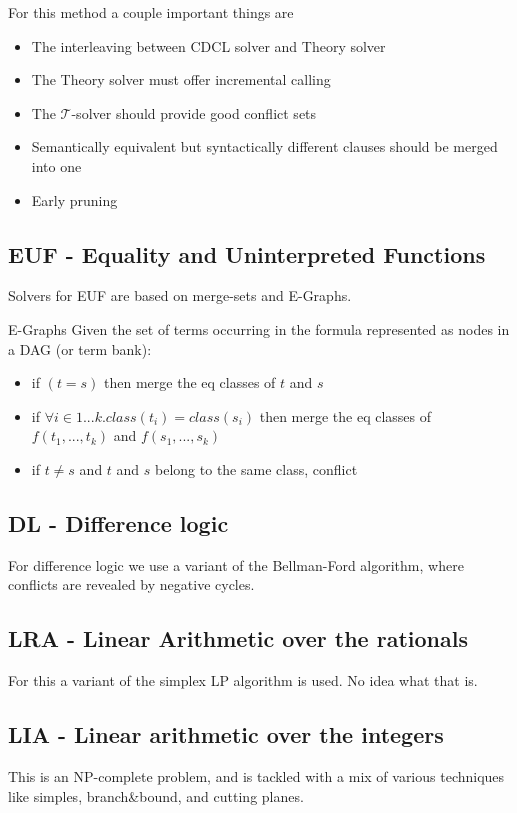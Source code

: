 \documentclass{article}
\begin{document}
For this method a couple important things are
\begin{itemize}
    \item The interleaving between CDCL solver and Theory solver
    \item The Theory solver must offer incremental calling
    \item The $\mathcal T$-solver should provide good conflict sets
    \item Semantically equivalent but syntactically different clauses should be merged into one
    \item Early pruning
\end{itemize}

\subsection*{EUF - Equality and Uninterpreted Functions}
Solvers for EUF are based on merge-sets and E-Graphs.
\begin{callout}{E-Graphs}
    Given the set of terms occurring in the formula represented as nodes in a DAG (or term bank):
    \begin{itemize}
        \item if $(t=s)$ then merge the eq classes of $t$ and $s$
        \item if $\forall i\in 1...k. class(t_i)=class(s_i)$ then merge the eq classes of $f(t_1,...,t_k)$ and $f(s_1,...,s_k)$
        \item if $t\neq s$ and $t$ and $s$ belong to the same class, conflict
    \end{itemize}
\end{callout}

\subsection*{DL - Difference logic}
For difference logic we use a variant of the Bellman-Ford algorithm, where conflicts are revealed by negative cycles.

\subsection*{LRA - Linear Arithmetic over the rationals}
For this a variant of the simplex LP algorithm is used. No idea what that is.

\subsection*{LIA - Linear arithmetic over the integers}
This is an NP-complete problem, and is tackled with a mix of various techniques like simples, branch\&bound, and cutting planes.
\end{document}

